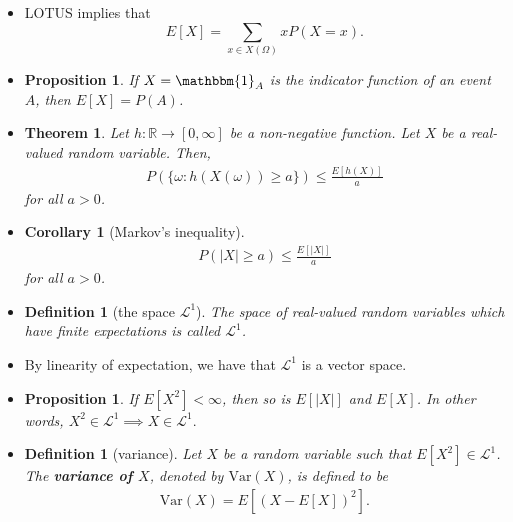 \documentclass[10pt]{article}
\newtheorem{theorem}[lemma]{Theorem}
\newtheorem{definition}[lemma]{Definition}
\newtheorem{proposition}[lemma]{Proposition}
\newtheorem{corollary}[lemma]{Corollary}
\numberwithin{lemma}{section}
\newcommand{\Var}{\mathrm{Var}}
\newcommand{\mcal}[1]{\mathcal{#1}}
\newcommand{\Real}{\mathbb{R}}
\begin{document}
\begin{itemize}
  \item LOTUS implies that $$E[X] = \sum_{x \in X(\Omega)} x P(X = x).$$

  \item \begin{proposition}
    If $X = \mathbbm{1}_A$ is the indicator function of an event $A$, then $E[X] = P(A)$. 
  \end{proposition}
  
  \item \begin{theorem} \label{thm:pre-markov}
    Let $h: \Real \rightarrow [0,\infty]$ be a non-negative function. Let $X$ be a real-valued random variable. Then,
    \begin{align*}
      P(\{ \omega: h(X(\omega)) \geq a \}) \leq \frac{E[h(X)]}{a}
    \end{align*}
    for all $a > 0$.
  \end{theorem}

  \item \begin{corollary}[Markov's inequality]
    \begin{align*}
      P(|X| \geq a) \leq \frac{E[|X|]}{a}
    \end{align*}
    for all $a > 0$.
  \end{corollary}

  \item \begin{definition}[the space $\mcal{L}^1$]
    The space of real-valued random variables which have finite expectations is called $\mcal{L}^1$.
  \end{definition}

  \item By linearity of expectation, we have that $\mcal{L}^1$ is a vector space.

  \item \begin{proposition}
    If $E[X^2] < \infty$, then so is $E[|X|]$ and $E[X]$. In other words, $X^2 \in \mcal{L}^1 \implies X \in \mcal{L}^1.$ 
  \end{proposition}
  
  \item \begin{definition}[variance]
    Let $X$ be a random variable such that $E[X^2] \in \mcal{L}^1$. The {\bf variance of $X$}, denoted by $\Var(X)$, is defined to be
    \begin{align*}
      \Var(X) = E[(X - E[X])^2].
    \end{align*}
  \end{definition}


\end{itemize}
\end{document}
